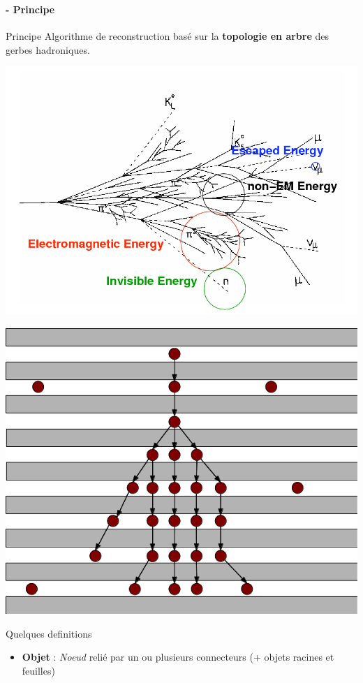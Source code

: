 \documentclass[8pt]{beamer}
\begin{document}
  \begin{frame}
  \frametitle{\secname}
  \framesubtitle{\subsecname - Principe}
    \begin{block}{Principe}
      Algorithme de reconstruction basé sur la \textbf{topologie en arbre} des gerbes hadroniques.
    \end{block}
    \pause
    \begin{minipage}{0.48\linewidth}
      \begin{center}
        \includegraphics[width=0.8\linewidth]{hadronic_shower.png}      
      \end{center}
    \end{minipage} \hfill
    \begin{minipage}{0.48\linewidth}
      \begin{center}
        \includegraphics[angle=90, width=0.5\linewidth]{ArborSchema.png}        
      \end{center}
    \end{minipage}
    \pause
    \begin{block}{Quelques definitions}
      \begin{itemize}
        \item \textbf{Objet} : \textit{Noeud} relié par un ou plusieurs connecteurs (+ objets racines et feuilles)

\end{itemize}
\end{block}
\end{frame}
\end{document}
